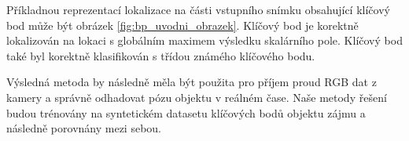 Příkladnou reprezentací lokalizace na části vstupního snímku obsahující klíčový bod může být obrázek \ref{fig:bp_uvodni_obrazek}. Klíčový bod je korektně lokalizován na lokaci s globálním maximem výsledku skalárního pole. Klíčový bod také byl korektně klasifikován s třídou známého klíčového bodu.

Výsledná metoda by následně měla být použita pro příjem proud RGB dat z kamery a správně odhadovat pózu objektu v reálném čase. Naše metody řešení budou trénovány na syntetickém datasetu klíčových bodů objektu zájmu a následně porovnány mezi sebou.
\endinput